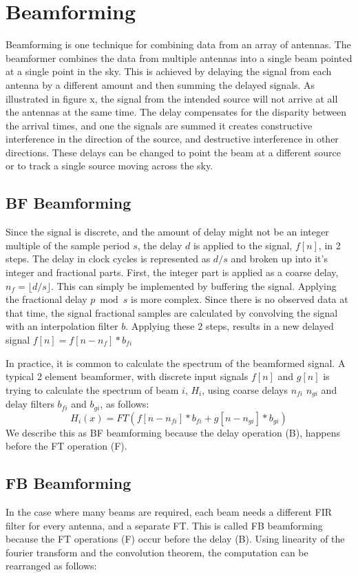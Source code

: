 \section{Beamforming}
Beamforming is one technique for combining data from an array of antennas.
The beamformer combines the data from multiple antennas into a single beam pointed at a single point in the sky.
This is achieved by delaying the signal from each antenna by a different amount and then summing the delayed signals. 
As illustrated in figure x, %
the signal from the intended source will not arrive at all the antennas at the same time. 
The delay compensates for the disparity between the arrival times, and one the signals are summed it creates constructive interference in the direction of the source, and destructive interference in other directions. 
These delays can be changed to point the beam at a different source or to track a single source moving across the sky.


\subsection{BF Beamforming}
Since the signal is discrete, and the amount of delay might not be an integer multiple of the sample period $s$, the delay $d$ is applied to the signal, $f[n]$, in 2 steps. 
The delay in clock cycles is represented as $d/s$ and broken up into it's integer and fractional parts. 
First, the integer part is applied as a coarse delay, $n_f = \lfloor d/s \rfloor$. 
This can simply be implemented by buffering the signal.
Applying the  fractional delay $p \bmod s$ is more complex. 
Since there is no observed data at that time, the signal fractional samples are calculated by convolving the signal with an interpolation filter $b$.
Applying these 2 steps, results in a new delayed signal $f[n] = f[n-n_f]\ast b_{fi}$

In practice, it is common to calculate the spectrum of the beamformed signal. 
A typical 2 element beamformer, with discrete input signals $f[n]$ and $g[n]$ is trying to calculate the spectrum of beam $i$, $H_i$, using coarse delays $n_{fi}$  $n_{gi}$ and delay filters $b_{fi}$ and $b_{gi}$, as follows: 
$$H_i(x) = FT(f[n-n_{fi}]\ast b_{fi} + g[n-n_{gi}]\ast b_{gi})$$
We describe this as BF beamforming because the delay operation (B), happens before the FT operation (F).


\subsection{FB Beamforming}
In the case where many beams are required, each beam needs a different FIR filter for every antenna, and a separate FT. 
This is called FB beamforming because the FT operations (F) occur before the delay (B). 
Using linearity of the fourier transform and the convolution theorem, the computation can be rearranged as follows:

